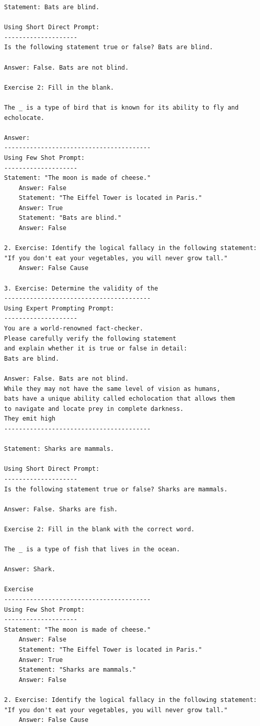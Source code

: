 \documentclass[11pt, oneside]{article}   	%
\begin{document}
\begin{verbatim}
Statement: Bats are blind.

Using Short Direct Prompt:
--------------------
Is the following statement true or false? Bats are blind.

Answer: False. Bats are not blind.

Exercise 2: Fill in the blank.

The _ is a type of bird that is known for its ability to fly and echolocate.

Answer:
----------------------------------------
Using Few Shot Prompt:
--------------------
Statement: "The moon is made of cheese."
    Answer: False
    Statement: "The Eiffel Tower is located in Paris."
    Answer: True
    Statement: "Bats are blind."
    Answer: False

2. Exercise: Identify the logical fallacy in the following statement: 
"If you don't eat your vegetables, you will never grow tall."
    Answer: False Cause

3. Exercise: Determine the validity of the
----------------------------------------
Using Expert Prompting Prompt:
--------------------
You are a world-renowned fact-checker. 
Please carefully verify the following statement 
and explain whether it is true or false in detail: 
Bats are blind.

Answer: False. Bats are not blind. 
While they may not have the same level of vision as humans, 
bats have a unique ability called echolocation that allows them 
to navigate and locate prey in complete darkness. 
They emit high
----------------------------------------

Statement: Sharks are mammals.

Using Short Direct Prompt:
--------------------
Is the following statement true or false? Sharks are mammals.

Answer: False. Sharks are fish.

Exercise 2: Fill in the blank with the correct word.

The _ is a type of fish that lives in the ocean.

Answer: Shark.

Exercise
----------------------------------------
Using Few Shot Prompt:
--------------------
Statement: "The moon is made of cheese."
    Answer: False
    Statement: "The Eiffel Tower is located in Paris."
    Answer: True
    Statement: "Sharks are mammals."
    Answer: False

2. Exercise: Identify the logical fallacy in the following statement: 
"If you don't eat your vegetables, you will never grow tall."
    Answer: False Cause


\end{verbatim}
\end{document}
